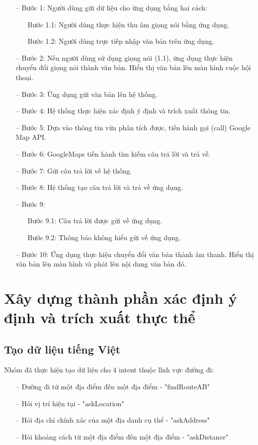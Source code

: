 \begin{itemize}
    \item[--] Bước 1: Người dùng gửi dữ liệu cho ứng dụng bằng hai cách:
    \begin{itemize}
        \item[\textbullet] Bước 1.1: Người dùng thực hiện thu âm giọng nói bằng ứng dụng.
        \item[\textbullet] Bước 1.2: Người dùng trực tiếp nhập văn bản trên ứng dụng.
    \end{itemize} 
    \item[--] Bước 2: Nếu người dùng sử dụng giọng nói (1.1), ứng dụng thực hiện chuyển đổi giọng nói thành văn bản. Hiển thị văn bản lên màn hình cuộc hội thoại.
    \item[--] Bước 3: Ứng dụng gửi văn bản lên hệ thống. 
    \item[--] Bước 4: Hệ thống thực hiện xác định ý định và trích xuất thông tin. 
    \item[--] Bước 5: Dựa vào thông tin vừa phân tích được, tiến hành gọi (call) Google Map API.
    \item[--] Bước 6: GoogleMaps tiến hành tìm kiếm câu trả lời và trả về.
    \item[--] Bước 7: Gửi câu trả lời về hệ thống.
    \item[--] Bước 8: Hệ thống tạo câu trả lời và trả về ứng dụng. 
    \item[--] Bước 9:  
    \begin{itemize}
        \item[\textbullet] Bước 9.1: Câu trả lời được gửi về ứng dụng.
        \item[\textbullet] Bước 9.2: Thông báo không hiểu gửi về ứng dụng.
    \end{itemize} 
    \item[--] Bước 10: Ứng dụng thực hiện chuyển đổi văn bản thành âm thanh. Hiển thị văn bản lên màn hình và phát lên nội dung văn bản đó.
\end{itemize}
\section{Xây dựng thành phần xác định ý định và trích xuất thực thể}
\subsection{Tạo dữ liệu tiếng Việt}
Nhóm đã thực hiện tạo dữ liệu cho 4 intent thuộc lĩnh vực đường đi:

\begin{itemize}
    \item[--] Đường đi từ một địa điểm đến một địa điểm - "findRouteAB"
    \item[--] Hỏi vị trí hiện tại - "askLocation"
    \item[--] Hỏi địa chỉ chính xác của một địa danh cụ thể - "askAddress"
    \item[--] Hỏi khoảng cách từ một địa điểm đến một địa điểm - "askDistance"
\end{itemize}

